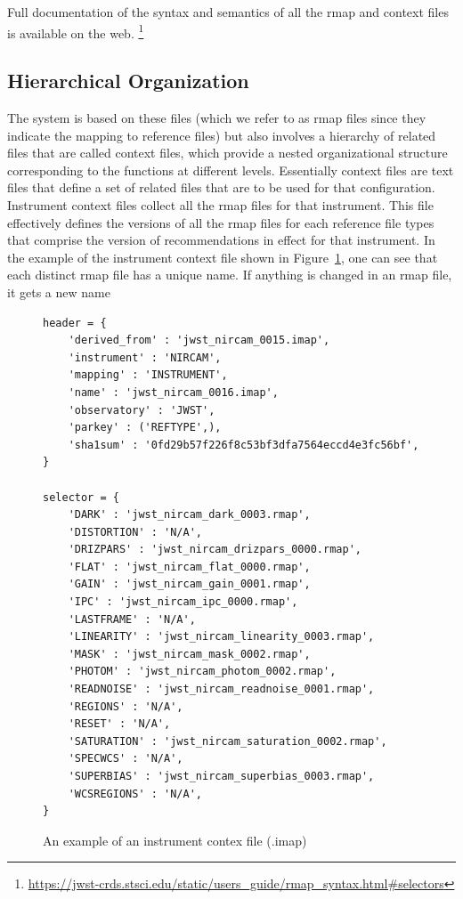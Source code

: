 \documentclass[final,authoryear,5p,times,twocolumn]{elsarticle}
\begin{document}
Full documentation of the syntax and semantics of all the rmap and
context files is available on the web.
\footnote{\url{https://jwst-crds.stsci.edu/static/users\_guide/rmap\_syntax.html\#selectors}}

\subsection{Hierarchical Organization}

The system is based on these files (which we refer to as rmap files since they
indicate the mapping to reference files) but also involves a hierarchy of
related files that are called context files, which provide a nested 
organizational structure corresponding to the functions at different levels. Essentially context files are
text files that define a set of related files that are to be used for
that configuration.
Instrument context files collect all the rmap files for that
instrument. This file effectively defines the versions of all the rmap files
for each reference file types that comprise the version of recommendations in
effect for that instrument. In the example of the instrument context file
shown in Figure~\ref{fig:example_instrument_context},
one can see that each distinct rmap file has a unique name. If anything
is changed in an rmap file, it gets a new name

\begin{figure}
\begin{verbatim}
header = {
    'derived_from' : 'jwst_nircam_0015.imap',
    'instrument' : 'NIRCAM',
    'mapping' : 'INSTRUMENT',
    'name' : 'jwst_nircam_0016.imap',
    'observatory' : 'JWST',
    'parkey' : ('REFTYPE',),
    'sha1sum' : '0fd29b57f226f8c53bf3dfa7564eccd4e3fc56bf',
}

selector = {
    'DARK' : 'jwst_nircam_dark_0003.rmap',
    'DISTORTION' : 'N/A',
    'DRIZPARS' : 'jwst_nircam_drizpars_0000.rmap',
    'FLAT' : 'jwst_nircam_flat_0000.rmap',
    'GAIN' : 'jwst_nircam_gain_0001.rmap',
    'IPC' : 'jwst_nircam_ipc_0000.rmap',
    'LASTFRAME' : 'N/A',
    'LINEARITY' : 'jwst_nircam_linearity_0003.rmap',
    'MASK' : 'jwst_nircam_mask_0002.rmap',
    'PHOTOM' : 'jwst_nircam_photom_0002.rmap',
    'READNOISE' : 'jwst_nircam_readnoise_0001.rmap',
    'REGIONS' : 'N/A',
    'RESET' : 'N/A',
    'SATURATION' : 'jwst_nircam_saturation_0002.rmap',
    'SPECWCS' : 'N/A',
    'SUPERBIAS' : 'jwst_nircam_superbias_0003.rmap',
    'WCSREGIONS' : 'N/A',
}
\end{verbatim}
\caption{An example of an instrument contex file (.imap)}
\label{fig:example_instrument_context}
\end{figure}
\end{document}
